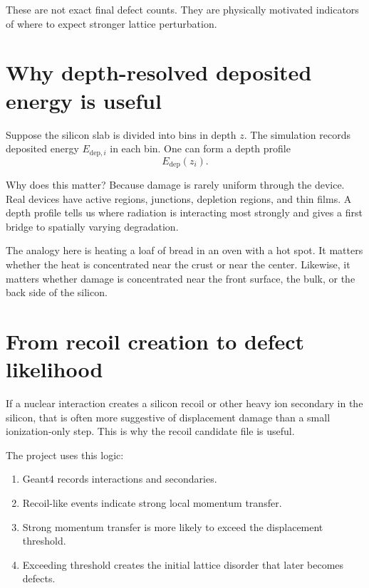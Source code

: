 \documentclass[11pt]{article}
\begin{document}
These are not exact final defect counts. They are physically motivated indicators of where to expect stronger lattice perturbation.

\section{Why depth-resolved deposited energy is useful}
Suppose the silicon slab is divided into bins in depth $z$. The simulation records deposited energy $E_{\mathrm{dep},i}$ in each bin. One can form a depth profile
\begin{equation}
E_{\mathrm{dep}}(z_i).
\end{equation}

Why does this matter? Because damage is rarely uniform through the device. Real devices have active regions, junctions, depletion regions, and thin films. A depth profile tells us where radiation is interacting most strongly and gives a first bridge to spatially varying degradation.

The analogy here is heating a loaf of bread in an oven with a hot spot. It matters whether the heat is concentrated near the crust or near the center. Likewise, it matters whether damage is concentrated near the front surface, the bulk, or the back side of the silicon.

\section{From recoil creation to defect likelihood}
If a nuclear interaction creates a silicon recoil or other heavy ion secondary in the silicon, that is often more suggestive of displacement damage than a small ionization-only step. This is why the recoil candidate file is useful.

The project uses this logic:
\begin{enumerate}[label=\arabic*.]
    \item Geant4 records interactions and secondaries.
    \item Recoil-like events indicate strong local momentum transfer.
    \item Strong momentum transfer is more likely to exceed the displacement threshold.
    \item Exceeding threshold creates the initial lattice disorder that later becomes defects.
\end{enumerate}
\end{document}
